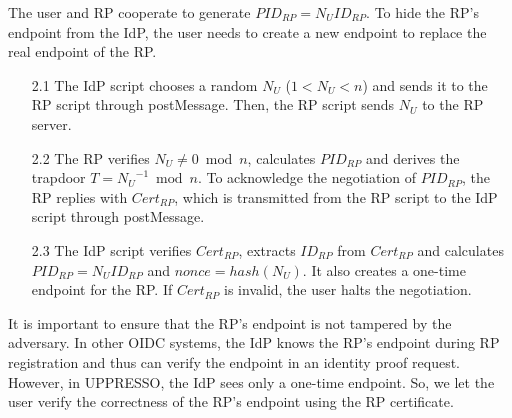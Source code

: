 The user and RP cooperate to generate $PID_{RP} = {N_{U}}{ID_{RP}}$. To hide the RP's endpoint from the IdP, the user needs to create a new endpoint to replace the real endpoint of the RP.
\vspace{-\topsep}
\begin{itemize}
\item[2.1] The IdP script chooses a random $N_U$ ($1 < N_U <n$) and sends it to the RP script through postMessage. Then, the RP script sends $N_U$ to the RP server.
\vspace{-\topsep}
\item[2.2] The RP verifies $N_{U} \neq 0 \bmod n$, calculates $PID_{RP}$ and derives the trapdoor $T={N_U}^{-1} \bmod n$. To acknowledge the negotiation of $PID_{RP}$, the RP replies with $Cert_{RP}$, which is transmitted from the RP script to the IdP script through postMessage.
\vspace{-\topsep}
\item[2.3] The IdP script verifies $Cert_{RP}$, extracts $ID_{RP}$ from $Cert_{RP}$ and calculates $PID_{RP}={N_{U}}{ID_{RP}}$ and $nonce=hash(N_U)$. It also creates a one-time endpoint for the RP. If $Cert_{RP}$ is invalid, the user halts the negotiation.
\end{itemize}
\vspace{-\topsep}
It is important to ensure that the RP's endpoint is not tampered by the adversary. In other OIDC systems, the IdP knows the RP's endpoint during RP registration and thus can verify the endpoint in an identity proof request. However, in UPPRESSO, the IdP sees only a one-time endpoint. So, we let the user verify the correctness of the RP's endpoint using the RP certificate. %


